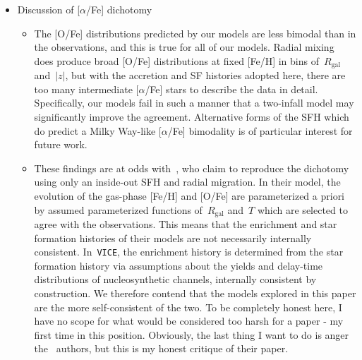 \documentclass[fleqn, usenatbib]{mnras}
\begin{document}
\begin{itemize}
	\item Discussion of [$\alpha$/Fe] dichotomy 
	\begin{itemize} 
		\item The [O/Fe] distributions predicted by our models are less bimodal 
		than in the observations, and this is true for all of our models. 
		Radial mixing does produce broad [O/Fe] distributions at fixed [Fe/H] 
		in bins of~$R_\text{gal}$ and~$\left|z\right|$, but with the accretion 
		and SF histories adopted here, there are too many intermediate 
		[$\alpha$/Fe] stars to describe the data in detail. Specifically, our 
		models fail in such a manner that a two-infall model
		\citep[e.g.][]{Chiappini1997, Chiappini2001, Romano2010, Grisoni2017, 
		Noguchi2018, Spitoni2016, Spitoni2018, Spitoni2019, Spitoni2020, 
		Spitoni2021} may significantly improve the agreement. Alternative forms 
		of the SFH which do predict a Milky Way-like [$\alpha$/Fe] bimodality 
		is of particular interest for future work. 

		\item These findings are at odds with~\citet{Sharma2020}, who claim to 
		reproduce the dichotomy using only an inside-out SFH and radial 
		migration. In their model, the evolution of the gas-phase [Fe/H] and 
		[O/Fe] are parameterized a priori by assumed parameterized functions 
		of~$R_\text{gal}$ and~$T$ which are selected to agree with the 
		observations. This means that the enrichment and star formation 
		histories of their models are not necessarily internally consistent. 
		In~\texttt{VICE}, the enrichment history is determined from the star 
		formation history via assumptions about the yields and delay-time 
		distributions of nucleosynthetic channels, internally consistent by 
		construction. We therefore contend that the models explored in this 
		paper are the more self-consistent of the two. {\color{red} To be 
		completely honest here, I have no scope for what would be considered 
		too harsh for a paper - my first time in this position. Obviously, the 
		last thing I want to do is anger the~\citet{Sharma2020} authors, but 
		this is my honest critique of their paper. } 
	\end{itemize} 


\end{itemize}
\end{document}
